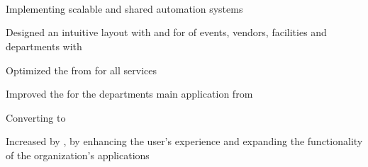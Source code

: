 \documentclass[]{hackathons}
\begin{document}
%
%

\begin{minipage}[t]{0.64\textwidth} 

%
%

 \\

\smallbreak
\smallbreak
\smallbreak
\smallbreak
\smallbreak


\section{} 

\begin{tightemize}
\item Implementing scalable and shared  automation systems
\item Designed an intuitive layout with  and  for  of events, vendors, facilities and departments with 
\item Optimized the  from  for all services
\item Improved the  for the departments main application from 
\item Converting  to 
\item Increased  by , by enhancing the user's experience and expanding the functionality of the organization's applications
\end{tightemize}
\medskip


\end{minipage}
\end{document}

